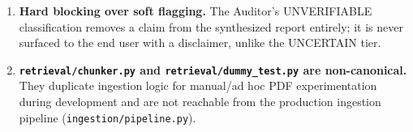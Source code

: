 \documentclass[11pt,a4paper]{report}
\newcommand{\file}[1]{\texttt{\small #1}}
\begin{document}
\begin{enumerate}[leftmargin=1.5em]
    \file{core/unit\_normalizer.py} before either the Comparator or Synthesizer LLM
    stage sees the data -- explicitly to prevent LLM arithmetic hallucination on
    financial figures.
    \item \textbf{Hard blocking over soft flagging.} The Auditor's UNVERIFIABLE
    classification removes a claim from the synthesized report entirely; it is never
    surfaced to the end user with a disclaimer, unlike the UNCERTAIN tier.
    \item \textbf{\file{retrieval/chunker.py} and \file{retrieval/dummy\_test.py} are
    non-canonical.} They duplicate ingestion logic for manual/ad hoc PDF
    experimentation during development and are not reachable from the production
    ingestion pipeline (\file{ingestion/pipeline.py}).
\end{enumerate}
\end{document}
